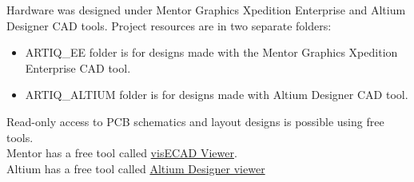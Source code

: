 Hardware was designed under Mentor Graphics Xpedition Enterprise and Altium Designer CAD tools.
Project resources are in two separate folders:
\begin{itemize}
	\item ARTIQ\_EE folder is for designs made with the Mentor Graphics Xpedition Enterprise CAD tool.
	\item ARTIQ\_ALTIUM folder is for designs made with Altium Designer CAD tool.
\end{itemize}
Read-only access to PCB schematics and layout designs is possible using free tools.\\
Mentor has a free tool called
\href{https://www.mentor.com/pcb/downloads/visecad-viewer/}{visECAD
Viewer}.\\
Altium has a free tool called 
\href{http://www.altium.com/altium-designer-viewer}{Altium Designer viewer}
